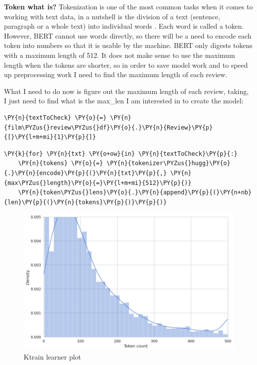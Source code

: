\textbf{Token what is?}\cite{noauthor_what_2019}
Tokenization is one of the most common tasks when it comes to working with text data, in a nutshell is the division of a text (sentence, paragraph or a whole text) into individual words . Each word is called a token.
However, BERT cannot use words directly, so there will be a need to encode each token into numbers so that it is usable by the machine.
BERT only digests tokens with a maximum length of 512.
It does not make sense to use the maximum length when the tokens are shorter, so in order to save model work and to speed up preprocessing work I need to find the maximum length of each review.

What I need to do now is figure out the maximum length of each review, taking, I just need to find what is the max\_len I am interested in to create the model:

    \begin{tcolorbox}[breakable, size=fbox, boxrule=1pt, pad at break*=1mm,colback=cellbackground, colframe=cellborder]
\begin{Verbatim}[commandchars=\\\{\},fontsize=\footnotesize]
\PY{n}{textToCheck} \PY{o}{=} \PY{n}{film\PYZus{}review\PYZus{}df}\PY{o}{.}\PY{n}{Review}\PY{p}{[}\PY{l+m+mi}{1}\PY{p}{]}
\end{Verbatim}
\end{tcolorbox}

    \begin{tcolorbox}[breakable, size=fbox, boxrule=1pt, pad at break*=1mm,colback=cellbackground, colframe=cellborder]
\begin{Verbatim}[commandchars=\\\{\},fontsize=\footnotesize]
\PY{k}{for} \PY{n}{txt} \PY{o+ow}{in} \PY{n}{textToCheck}\PY{p}{:}
    \PY{n}{tokens} \PY{o}{=} \PY{n}{tokenizer\PYZus{}hugg}\PY{o}{.}\PY{n}{encode}\PY{p}{(}\PY{n}{txt}\PY{p}{,} \PY{n}{max\PYZus{}length}\PY{o}{=}\PY{l+m+mi}{512}\PY{p}{)}
    \PY{n}{token\PYZus{}lens}\PY{o}{.}\PY{n}{append}\PY{p}{(}\PY{n+nb}{len}\PY{p}{(}\PY{n}{tokens}\PY{p}{)}\PY{p}{)}
\end{Verbatim}
\end{tcolorbox}

\begin{figure}[ht!]
\centering
\includegraphics[width=1\textwidth]{images/512.png}
\caption{Ktrain learner plot}
\label{fig:fig_07}
\end{figure}
\FloatBarrier

